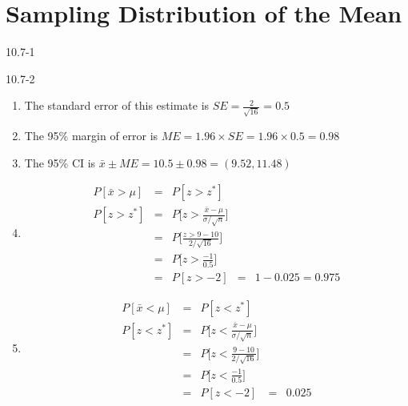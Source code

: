 \setcounter{chapter}{10}\chapter{Sampling Distribution of the Mean}
\begin{exsol@solution}{10.7-1}
\end{exsol@solution}
\begin{exsol@solution}{10.7-2}
\begin{enumerate}
  \item The standard error of this estimate is $SE = \frac{2}{\sqrt{16}} = 0.5$
  \item The 95\% margin of error is $ME = 1.96 \times SE = 1.96 \times 0.5 = 0.98$
  \item The 95\% CI is $\bar{x} \pm ME = 10.5 \pm 0.98 = (9.52, 11.48) $
  \item
  \begin{eqnarray*}
      P[ \bar{x} > \mu ] &=& P[z > z^*] \\
       P[z > z^*] &=& P\Big[ z > \frac{ \bar{x}-\mu}{ \sigma/\sqrt{n}} \Big] \\
       &=& P\Big[ \frac{z > 9 - 10}{ 2/\sqrt{16}} \Big] \\
       &=& P\Big[ z > \frac{-1}{0.5} \Big]   \\
        &=& P[z > -2]
        &=& 1 - 0.025 = 0.975
  \end{eqnarray*}

  \item
  \begin{eqnarray*}
      P[ \bar{x} < \mu ] &=& P[z < z^*] \\
       P[z < z^*] &=& P\Big[ z < \frac{ \bar{x}-\mu}{ \sigma/\sqrt{n}} \Big] \\
       &=& P\Big[ z < \frac{ 9 - 10}{ 2/\sqrt{16}} \Big] \\
       &=& P\Big[ z < \frac{-1}{0.5} \Big]   \\
        &=& P[z < -2]
        &=&  0.025
  \end{eqnarray*}


\end{enumerate}
\end{exsol@solution}
